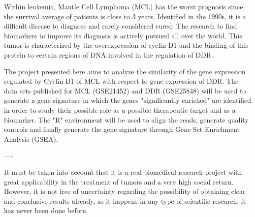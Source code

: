 Within leukemia, Mantle Cell Lymphoma (MCL) has the worst prognosis since the survival average of patients is close to 3 years. Identified in the 1990s, it is a difficult disease to diagnose and rarely considered cured. The research to find biomarkers to improve its diagnosis is actively pursued all over the world. This tumor is characterized by the overexpression of cyclin D1 and the binding of this protein to certain regions of DNA involved in the regulation of DDR.

The project presented here aims to analyze the similarity of the gene expression regulated by Cyclin D1 of MCL with respect to gene expression of DDR. The data sets published for MCL (GSE21452) and DDR (GSE25848) will be used to generate a gene signature in which the genes "significantly enriched" are identified in order to study their possible role as a possible therapeutic target and as a biomarker. The "R" environment will be used to align the reads, generate quality controls and finally generate the gene signature through Gene Set Enrichment Analysis (GSEA).

----


It must be taken into account that it is a real biomedical research project with great applicability in the treatment of tumors and a very high social return. However, it is not free of uncertainty regarding the possibility of obtaining clear and conclusive results already, as it happens in any type of scientific research, it has never been done before.
